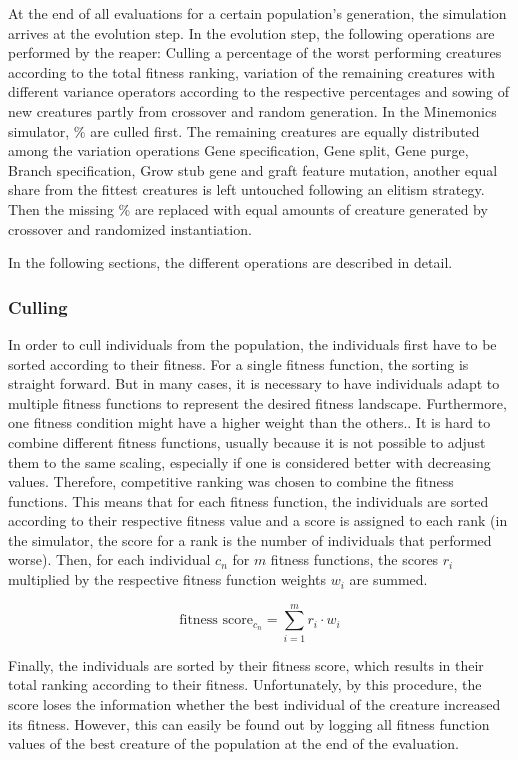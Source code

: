 \documentclass[main]{subfiles}
\begin{document}
At the end of all evaluations for a certain population's generation, the simulation arrives at the evolution step. %
%
In the evolution step, the following operations are performed by the reaper: Culling a percentage of the worst performing creatures according to the total fitness ranking, variation of the remaining creatures with different variance operators according to the respective percentages and sowing of new creatures partly from crossover and random generation. %
%
In the Minemonics simulator, \unit[30]{\%} are culled first. The remaining creatures are equally distributed among the variation operations Gene specification, Gene split, Gene purge, Branch specification, Grow stub gene and graft feature mutation, another equal share from the fittest creatures is left untouched following an elitism strategy. Then the missing \unit[30]{\%} are replaced with equal amounts of creature generated by crossover and randomized instantiation.

In the following sections, the different operations are described in detail.

\subsubsection{Culling}
\label{subsubsection:Culling}

In order to cull individuals from the population, the individuals first have to be sorted according to their fitness. %
%
For a single fitness function, the sorting is straight forward. %
%
But in many cases, it is necessary to have individuals adapt to multiple fitness functions to represent the desired fitness landscape. %
%
Furthermore, one fitness condition might have a higher weight than the others.. %
%
It is hard to combine different fitness functions, usually because it is not possible to adjust them to the same scaling, especially if one is considered better with decreasing values. %
%
Therefore, competitive ranking was chosen to combine the fitness functions. %
%
This means that for each fitness function, the individuals are sorted according to their respective fitness value and a score is assigned to each rank (in the simulator, the score for a rank is the number of individuals that performed worse). %
%
Then, for each individual $c_n$ for $m$ fitness functions, the scores $r_i$ multiplied by the respective fitness function weights $w_i$ are summed. 

\[\text{fitness score}_{c_n} = \sum\limits^m_{i=1} r_i \cdot w_i \]

Finally, the individuals are sorted by their fitness score, which results in their total ranking according to their fitness. %
%
Unfortunately, by this procedure, the score loses the information whether the best individual of the creature increased its fitness. %
%
However, this can easily be found out by logging all fitness function values of the best creature of the population at the end of the evaluation.
\end{document}
